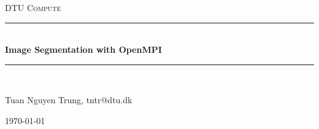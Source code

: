 \documentclass[a4paper]{report}
\makeatletter
\newcommand{\Title}{Image Segmentation with OpenMPI}
\newcommand{\Department}{DTU Compute}
\newcommand{\Date}{\today}
\newcommand{\Nameone}{Tuan Nguyen Trung}
\newcommand{\Mailone}{tntr@dtu.dk}
\newcommand{\HRule}{\rule{\linewidth}{0.5mm}} %
\makeatother
\begin{document}
\begin{titlepage}
 	\begin{center}
		\noindent \textsc{\Large \Department }\\[0.2cm]
		\HRule \\[0.4cm]
		{ \huge \bfseries \Title}\\[0.4cm]
 		\HRule \\[1 cm]
		\begin{minipage}{0.6\textwidth}
			\large
			\Nameone, \Mailone
			\newline \newline \newline

			 
		\end{minipage}		
		\vfill
 	\end{center}
	\begin{center}
		{\large \Date}
	\end{center}
\end{titlepage}

\newpage

\newpage
\tableofcontents
\newpage
\listoffigures
\newpage










\newpage
\appendix


\end{document}
